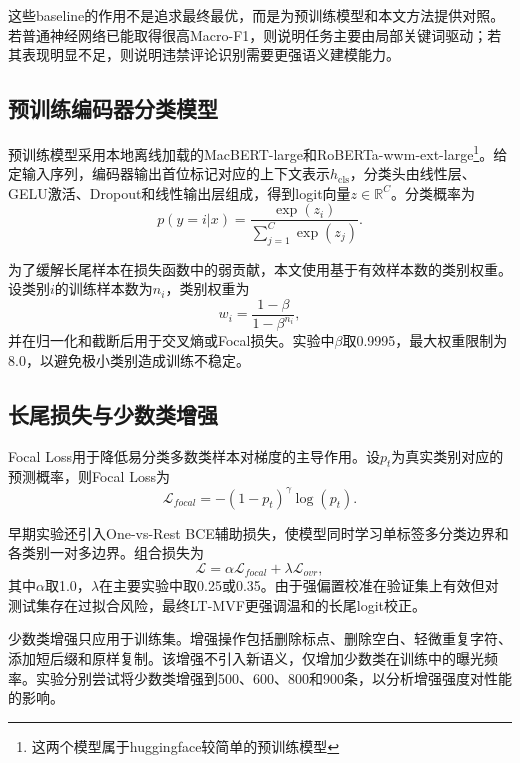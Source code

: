 \documentclass[UTF8, fontset=windows]{ctexart}
\begin{document}
	这些baseline的作用不是追求最终最优，而是为预训练模型和本文方法提供对照。若普通神经网络已能取得很高Macro-F1，则说明任务主要由局部关键词驱动；若其表现明显不足，则说明违禁评论识别需要更强语义建模能力。
	
	\subsection{预训练编码器分类模型}
	
	预训练模型采用本地离线加载的MacBERT-large和RoBERTa-wwm-ext-large\footnote{这两个模型属于huggingface较简单的预训练模型}。给定输入序列，编码器输出首位标记对应的上下文表示$h_{\mathrm{cls}}$，分类头由线性层、GELU激活、Dropout和线性输出层组成，得到logit向量$z\in\mathbb{R}^{C}$。分类概率为
	\begin{equation}
		p(y=i|x)=\frac{\exp(z_i)}{\sum_{j=1}^{C}\exp(z_j)}.
		\label{eq:softmax}
	\end{equation}
	
	为了缓解长尾样本在损失函数中的弱贡献，本文使用基于有效样本数的类别权重。设类别$i$的训练样本数为$n_i$，类别权重为
	\begin{equation}
		w_i=\frac{1-\beta}{1-\beta^{n_i}},
		\label{eq:effective_num}
	\end{equation}
	并在归一化和截断后用于交叉熵或Focal损失。实验中$\beta$取0.9995，最大权重限制为8.0，以避免极小类别造成训练不稳定。
	
	\subsection{长尾损失与少数类增强}
	
	Focal Loss用于降低易分类多数类样本对梯度的主导作用。设$p_t$为真实类别对应的预测概率，则Focal Loss为
	\begin{equation}
		\mathcal{L}_{focal}=-(1-p_t)^\gamma \log(p_t).
		\label{eq:focal}
	\end{equation}
	
	早期实验还引入One-vs-Rest BCE辅助损失，使模型同时学习单标签多分类边界和各类别一对多边界。组合损失为
	\begin{equation}
		\mathcal{L}=\alpha \mathcal{L}_{focal}+\lambda \mathcal{L}_{ovr},
		\label{eq:focal_bce}
	\end{equation}
	其中$\alpha$取1.0，$\lambda$在主要实验中取0.25或0.35。由于强偏置校准在验证集上有效但对测试集存在过拟合风险，最终LT-MVF更强调温和的长尾logit校正。
	
	少数类增强只应用于训练集。增强操作包括删除标点、删除空白、轻微重复字符、添加短后缀和原样复制。该增强不引入新语义，仅增加少数类在训练中的曝光频率。实验分别尝试将少数类增强到500、600、800和900条，以分析增强强度对性能的影响。
	
\end{document}
